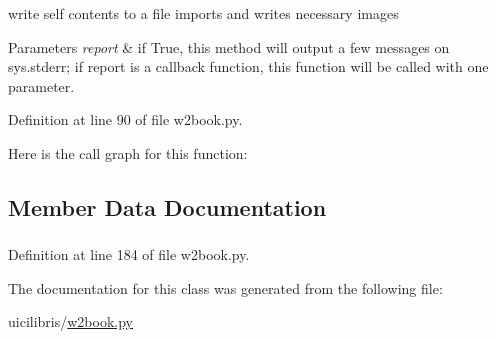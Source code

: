 write self contents to a file imports and writes necessary images 


\begin{DoxyParams}{\-Parameters}
{\em report} & if \-True, this method will output a few messages on sys.\-stderr; if report is a callback function, this function will be called with one parameter. \\
\hline
\end{DoxyParams}


\-Definition at line 90 of file w2book.\-py.



\-Here is the call graph for this function\-:




\subsection{\-Member \-Data \-Documentation}
\hypertarget{classuicilibris_1_1w2book_1_1wiki2_ab1461398f11b498a73d850d22220fca4}{
\subsubsection[{state}]{}}\label{classuicilibris_1_1w2book_1_1wiki2_ab1461398f11b498a73d850d22220fca4}


\-Definition at line 184 of file w2book.\-py.



\-The documentation for this class was generated from the following file\-:\begin{DoxyCompactItemize}
\item 
uicilibris/\hyperlink{w2book_8py}{w2book.\-py}\end{DoxyCompactItemize}
